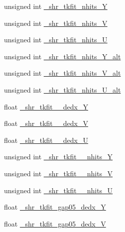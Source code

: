 \begin{DoxyCompactItemize}
\item 
unsigned int \hyperlink{classselection_1_1CC0piNpSelection_ae3a53326b19594013c9df08b66ccaa73}{\+\_\+shr\+\_\+tkfit\+\_\+nhits\+\_\+Y}
\item 
unsigned int \hyperlink{classselection_1_1CC0piNpSelection_adab23c54dd799cdf83c31a10e4ae9061}{\+\_\+shr\+\_\+tkfit\+\_\+nhits\+\_\+V}
\item 
unsigned int \hyperlink{classselection_1_1CC0piNpSelection_a6c75f5783174133ce97849f128f3dee3}{\+\_\+shr\+\_\+tkfit\+\_\+nhits\+\_\+U}
\item 
unsigned int \hyperlink{classselection_1_1CC0piNpSelection_ae147f3006253b7689636993c76221f21}{\+\_\+shr\+\_\+tkfit\+\_\+nhits\+\_\+\+Y\+\_\+alt}
\item 
unsigned int \hyperlink{classselection_1_1CC0piNpSelection_abd57bba0cf3b1c9268afc03e8713df13}{\+\_\+shr\+\_\+tkfit\+\_\+nhits\+\_\+\+V\+\_\+alt}
\item 
unsigned int \hyperlink{classselection_1_1CC0piNpSelection_a2a432bd36ae5dc824470183ca6621218}{\+\_\+shr\+\_\+tkfit\+\_\+nhits\+\_\+\+U\+\_\+alt}
\item 
float \hyperlink{classselection_1_1CC0piNpSelection_a3fce1b66b45df22120481d91b16957ba}{\+\_\+shr\+\_\+tkfit\+\_\+2cm\+\_\+dedx\+\_\+Y}
\item 
float \hyperlink{classselection_1_1CC0piNpSelection_a02be9f071fa5ee210e34b5914d428591}{\+\_\+shr\+\_\+tkfit\+\_\+2cm\+\_\+dedx\+\_\+V}
\item 
float \hyperlink{classselection_1_1CC0piNpSelection_a2ae6bb1925bd4f20deb1427c2bde2674}{\+\_\+shr\+\_\+tkfit\+\_\+2cm\+\_\+dedx\+\_\+U}
\item 
unsigned int \hyperlink{classselection_1_1CC0piNpSelection_a267f9073fa07d7c1c5e40b79a935c585}{\+\_\+shr\+\_\+tkfit\+\_\+2cm\+\_\+nhits\+\_\+Y}
\item 
unsigned int \hyperlink{classselection_1_1CC0piNpSelection_a4d79a5a52fba98286c68079f9a3e04cb}{\+\_\+shr\+\_\+tkfit\+\_\+2cm\+\_\+nhits\+\_\+V}
\item 
unsigned int \hyperlink{classselection_1_1CC0piNpSelection_ab659c0c62a77c77e745829478828e100}{\+\_\+shr\+\_\+tkfit\+\_\+2cm\+\_\+nhits\+\_\+U}
\item 
float \hyperlink{classselection_1_1CC0piNpSelection_a82a0f0efca7cceee176b7058001073a6}{\+\_\+shr\+\_\+tkfit\+\_\+gap05\+\_\+dedx\+\_\+Y}
\item 
float \hyperlink{classselection_1_1CC0piNpSelection_a711b325a6f6cb77db530eb21e1c99fc0}{\+\_\+shr\+\_\+tkfit\+\_\+gap05\+\_\+dedx\+\_\+V}

\end{DoxyCompactItemize}
